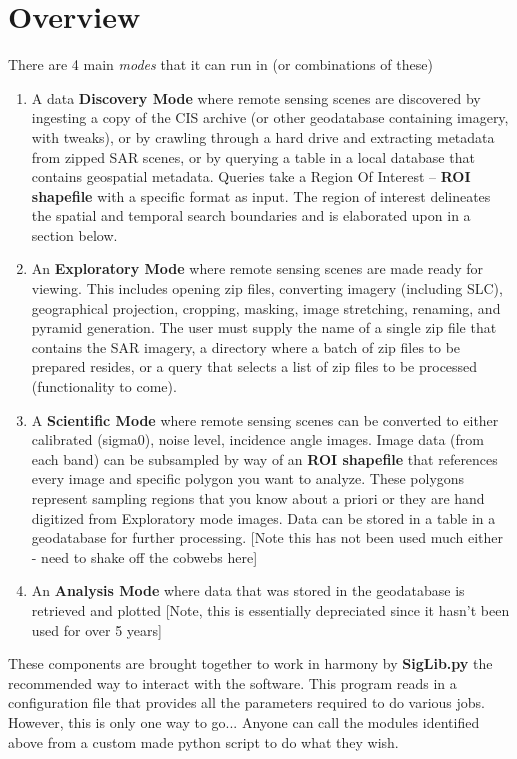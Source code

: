 \documentclass[letterpaper,10pt,english]{sphinxmanual}
\begin{document}
\section{Overview}
\label{intro:overview}
There are 4 main \emph{modes} that it can run in (or combinations of these)
\begin{enumerate}
\item {} 
A data \textbf{Discovery Mode} where remote sensing scenes are discovered
by ingesting a copy of the CIS archive (or other geodatabase
containing imagery, with tweaks), or by crawling through a hard drive
and extracting metadata from zipped SAR scenes, or by querying a
table in a local database that contains geospatial metadata. Queries
take a Region Of Interest -- \textbf{ROI shapefile} with a specific format
as input. The region of interest delineates the spatial and temporal
search boundaries and is elaborated upon in a section below.

\item {} 
An \textbf{Exploratory Mode} where remote sensing scenes are made ready
for viewing. This includes opening zip files, converting imagery
(including SLC), geographical projection, cropping, masking, image
stretching, renaming, and pyramid generation. The user must supply
the name of a single zip file that contains the SAR imagery, a
directory where a batch of zip files to be prepared resides, or a
query that selects a list of zip files to be processed (functionality
to come).

\item {} 
A \textbf{Scientific Mode} where remote sensing scenes can be converted to
either calibrated (sigma0), noise level, incidence angle images.
Image data (from each band) can be subsampled by way of an \textbf{ROI
shapefile} that references every image and specific polygon you want
to analyze. These polygons represent sampling regions that you know
about a priori or they are hand digitized from Exploratory mode
images. Data can be stored in a table in a geodatabase for further
processing. {[}Note this has not been used much either - need to shake
off the cobwebs here{]}

\item {} 
An \textbf{Analysis Mode} where data that was stored in the geodatabase is
retrieved and plotted {[}Note, this is essentially depreciated since it
hasn't been used for over 5 years{]}

\end{enumerate}

These components are brought together to work in harmony by
\textbf{SigLib.py} the recommended way to interact with the software. This
program reads in a configuration file that provides all the parameters
required to do various jobs. However, this is only one way to go...
Anyone can call the modules identified above from a custom made python
script to do what they wish.
\end{document}
